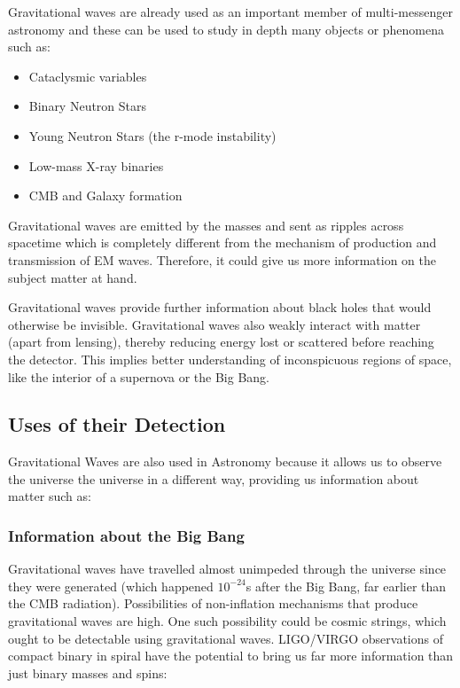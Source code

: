 \hspace{1cm}Gravitational waves are already used as an important member of multi-messenger astronomy and these can be used to study in depth many objects or phenomena such as:

\begin{itemize}

\item Cataclysmic variables
\item Binary Neutron Stars
\item Young Neutron Stars (the r-mode instability)
\item Low-mass X-ray binaries
\item CMB and Galaxy formation

\end{itemize}

\hspace{1cm}Gravitational waves are emitted by the masses and sent as ripples across spacetime which is completely different from the mechanism of production and transmission of EM waves. Therefore, it could give us more information on the subject matter at hand.

\hspace{1cm}Gravitational waves provide further information about black holes that would otherwise be invisible. Gravitational waves also weakly interact with matter (apart from lensing), thereby reducing energy lost or scattered before reaching the detector. This implies better understanding of inconspicuous regions of space, like the interior of a supernova or the Big Bang.

\subsection{Uses of their Detection}

\hspace{1cm} Gravitational Waves are also used in Astronomy because it allows us to observe the universe the universe in a different way, providing us information about matter such as:

\subsubsection{Information about the Big Bang}
\hspace{1cm}Gravitational waves have travelled almost unimpeded through the universe since they were generated (which happened $10^{-24}$s after the Big Bang, far earlier than the CMB radiation). Possibilities of non-inflation mechanisms that produce gravitational waves are high. One such possibility could be cosmic strings, which ought to be detectable using gravitational waves. LIGO/VIRGO observations of compact binary in spiral have the potential to bring us far more information than just binary masses and spins:

